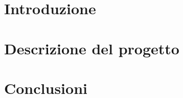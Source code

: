 \thispagestyle{empty} %
\cleardoublepage


\thispagestyle{empty}

\clearpage{\pagestyle{plain}\cleardoublepage}
\tableofcontents


\clearpage{\pagestyle{plain}\cleardoublepage} %

%


\clearpage{\pagestyle{plain}\cleardoublepage}
\chapter{Introduzione}


\clearpage{\pagestyle{plain}\cleardoublepage}
\chapter{Descrizione del progetto}
\label{cha:descrizione}


\clearpage{\pagestyle{plain}\cleardoublepage}
\chapter{Conclusioni}
\label{cha:conclusioni}





